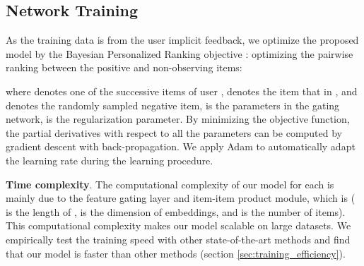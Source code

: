 \documentclass[sigconf]{acmart}
\begin{document}
\subsection{Network Training} \label{sec:network training}
As the training data is from the user implicit feedback, we optimize the proposed model by the Bayesian Personalized Ranking objective \cite{DBLP:conf/uai/RendleFGS09}: optimizing the pairwise ranking between the positive and non-observing items:

where  denotes one of the  successive items of user ,  denotes the item that in , and  denotes the randomly sampled negative item,  is the parameters in the gating network,  is the regularization parameter. By minimizing the objective function, the partial derivatives with respect to all the parameters can be computed by gradient descent with back-propagation. We apply Adam \cite{DBLP:journals/corr/KingmaB14} to automatically adapt the learning rate during the learning procedure. 

\textbf{Time complexity}. The computational complexity of our model for each  is mainly due to the feature gating layer and item-item product module, which is  ( is the length of ,  is the dimension of embeddings, and  is the number of items). This computational complexity makes our model scalable on large datasets. We empirically test the training speed with other state-of-the-art methods and find that our model is faster than other methods (section \ref{sec:training_efficiency}). 

\begin{comment}

\begin{algorithm}
  \textbf{Input}: , , , ,  \;
Initialize parameters , ,  \;
  numBatches =    \;
  \Repeat {convergence} {
    Shuffle(, , , , ) \;
    \For{batch = 0; batch < numBatches; batch++} {
       = ExtractBatchData(batch, , , , ) \;
      For each item  in , apply Eq. \ref{eq:slice_operation} to get  \;
      Apply Eq. \ref{eq:attention_matrix}, Eq. \ref{eq:item_embedding_matrix} and Eq. \ref{eq:item_content_embedding} to get  \;
      For each item  in , apply Eq. \ref{eq:rating_AE} to get  \;
      Apply Eq. \ref{eq:gated_fusion} to fuse  and  to get  \;
      Apply Eq. \ref{eq:neighbor_attention} to get 's neighborhood hidden representation  based on  \;
      Apply Eq. \ref{eq:rating_decoder} to get  \;
      Apply Eq. \ref{eq:final_loss} to get  and backpropagate the error through the entire network \;
    }
  }

\caption{Joint Training Algorithm}
\label{alg:batch_training_algorithm}
\end{algorithm}

\end{comment}
 
\end{document}
